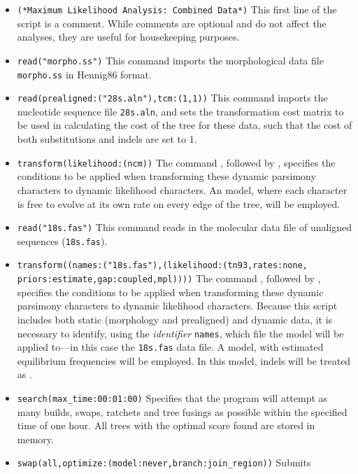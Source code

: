\begin{itemize}
\item \texttt{(*Maximum Likelihood Analysis: Combined Data*)} 
This first line of the script is a comment. While comments are 
optional and do not affect the analyses, they are useful for housekeeping 
purposes.
\item \texttt{read("morpho.ss")} This command imports the morphological 
data file \texttt{morpho.ss} in Hennig86 format. 
\item \texttt{read(prealigned:("28s.aln"),tcm:(1,1))} This command imports 
the  nucleotide sequence file \texttt{28s.aln}, 
and sets the transformation cost matrix to be used in calculating
the cost of the tree for these data, such that the cost of both substitutions 
and indels are set to $1$. 
\item \texttt{transform(likelihood:(ncm))} The command , 
followed by , specifies the conditions to be 
applied when transforming these dynamic parsimony characters to 
dynamic likelihood characters. An  model, where 
each character is free to evolve at its own rate on every edge of the tree, 
will be employed.
\item \texttt{read("18s.fas")} This command reads in the molecular 
data file of unaligned sequences (\texttt{18s.fas}).
\item \texttt{transform((names:("18s.fas"),(likelihood:(tn93,rates:none,\\
priors:estimate,gap:coupled,mpl))))} The command , 
followed by , specifies the conditions to be 
applied when transforming these dynamic parsimony characters to 
dynamic likelihood characters. Because this script includes both static 
(morphology and prealigned) and dynamic data, it is necessary to 
identify, using the \emph{identifier} \texttt{names}, which file the 
 model will be applied to---in this case the 
\texttt{18s.fas} data file. A  model, with estimated
equilibrium frequencies will be employed.  In this model, indels will be 
treated as .
\item \texttt{search(max\_time:00:01:00)} Specifies that the program will 
attempt as many builds, swaps, ratchets and tree fusings as possible within 
the specified time of one hour. All trees with the optimal score found are 
stored in memory.
\item \texttt{swap(all,optimize:(model:never,branch:join\_region))} Submits 

\end{itemize}
